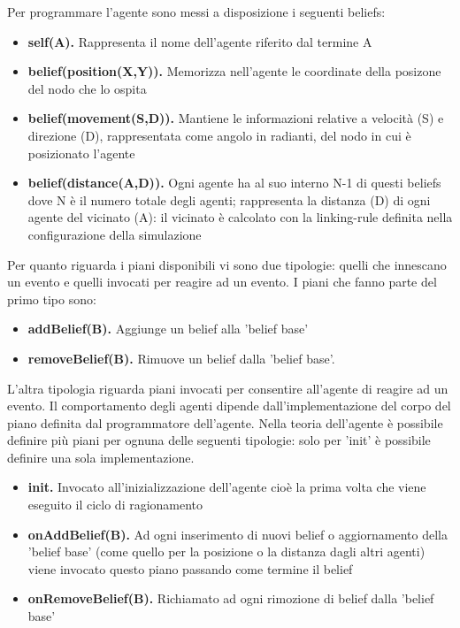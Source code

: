 \documentclass[12pt,a4paper,openright,twoside]{report}
\begin{document}
Per programmare l'agente sono messi a disposizione i seguenti beliefs:
\begin{itemize}
   \item \textbf{self(A).} Rappresenta il nome dell'agente riferito dal termine A
   \item \textbf{belief(position(X,Y)).} Memorizza nell'agente le coordinate della posizone del nodo che lo ospita
   \item \textbf{belief(movement(S,D)).} Mantiene le informazioni relative a velocit\`a (S) e direzione (D), rappresentata come angolo in radianti, del nodo in cui \`e posizionato l'agente
   \item \textbf{belief(distance(A,D)).} Ogni agente ha al suo interno N-1 di questi beliefs dove N \`e il numero totale degli agenti; rappresenta la distanza (D) di ogni agente del vicinato (A): il vicinato \`e calcolato con la linking-rule definita nella configurazione della simulazione
\end{itemize}

Per quanto riguarda i piani disponibili vi sono due tipologie: quelli che innescano un evento e quelli invocati per reagire ad un evento.
I piani che fanno parte del primo tipo sono:
\begin{itemize}
   \item \textbf{addBelief(B).} Aggiunge un belief alla 'belief base'
   \item \textbf{removeBelief(B).} Rimuove un belief dalla 'belief base'.
\end{itemize}
L'altra tipologia riguarda piani invocati per consentire all'agente di reagire ad un evento. Il comportamento degli agenti dipende dall'implementazione del corpo del piano definita dal programmatore dell'agente. Nella teoria dell'agente \`e possibile definire pi\`u piani per ognuna delle seguenti tipologie: solo per 'init' \`e possibile definire una sola implementazione.
\begin{itemize}
   \item \textbf{init.} Invocato all'inizializzazione dell'agente cio\`e la prima volta che viene eseguito il ciclo di ragionamento
   \item \textbf{onAddBelief(B).} Ad ogni inserimento di nuovi belief o aggiornamento della 'belief base' (come quello per la posizione o la distanza dagli altri agenti) viene invocato questo piano passando come termine il belief
   \item \textbf{onRemoveBelief(B).} Richiamato ad ogni rimozione di belief dalla 'belief base'
\end{itemize}
\end{document}
